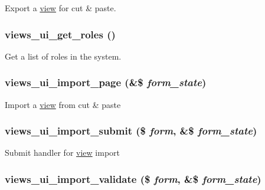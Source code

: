Export a \hyperlink{classview}{view} for cut \& paste. \hypertarget{admin_8inc_6c6227b21a8ca8e33eabfe00598410cd}{
\subsubsection[{views\_\-ui\_\-get\_\-roles}]{\setlength{\rightskip}{0pt plus 5cm}views\_\-ui\_\-get\_\-roles ()}}
\label{admin_8inc_6c6227b21a8ca8e33eabfe00598410cd}


Get a list of roles in the system. \hypertarget{admin_8inc_4cf23cf7b1b9b27fb6a3a93c90447b5f}{
\subsubsection[{views\_\-ui\_\-import\_\-page}]{\setlength{\rightskip}{0pt plus 5cm}views\_\-ui\_\-import\_\-page (\&\$ {\em form\_\-state})}}
\label{admin_8inc_4cf23cf7b1b9b27fb6a3a93c90447b5f}


Import a \hyperlink{classview}{view} from cut \& paste \hypertarget{admin_8inc_f208375534e14a238da0f2979bd7c43e}{
\subsubsection[{views\_\-ui\_\-import\_\-submit}]{\setlength{\rightskip}{0pt plus 5cm}views\_\-ui\_\-import\_\-submit (\$ {\em form}, \/  \&\$ {\em form\_\-state})}}
\label{admin_8inc_f208375534e14a238da0f2979bd7c43e}


Submit handler for \hyperlink{classview}{view} import \hypertarget{admin_8inc_d5771e62497700de3986f6b03a5a3ab6}{
\subsubsection[{views\_\-ui\_\-import\_\-validate}]{\setlength{\rightskip}{0pt plus 5cm}views\_\-ui\_\-import\_\-validate (\$ {\em form}, \/  \&\$ {\em form\_\-state})}}
\label{admin_8inc_d5771e62497700de3986f6b03a5a3ab6}



